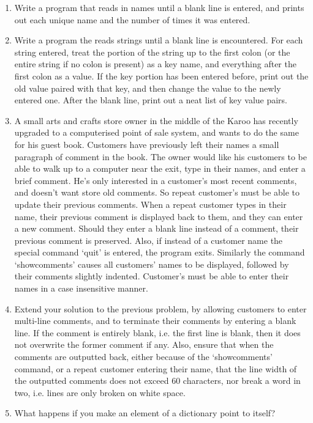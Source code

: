 \begin{enumerate}
\begin{enumerate}
\end{enumerate}
	\item Write a program that reads in names until a blank line is    entered, and prints out each unique name and the number of times    it was entered.
	\item Write a program the reads strings until a blank line is    encountered. For each string entered, treat the portion of the    string up to the first colon (or the entire string if no colon is    present) as a key name, and everything after the first colon as a    value. If the key portion has been entered before, print out the old    value paired with that key, and then change the value to the newly    entered one. After the blank line, print out a neat list of key    value pairs.
	\item A small arts and crafts store owner in the middle of the Karoo    has recently upgraded to a computerised point of sale system, and    wants to do the same for his guest book. Customers have previously    left their names a small paragraph of comment in the book. The owner    would like his customers to be able to walk up to a computer near    the exit, type in their names, and enter a brief comment. He's only    interested in a customer's most recent comments, and doesn't want    store old comments. So repeat customer's must be able to update    their previous comments. When a repeat customer types in their name,    their previous comment is displayed back to them, and they can       enter a new comment. Should they enter a    blank line instead of a comment, their previous comment is    preserved. Also, if instead of a customer name the special command    `quit' is entered, the program exits. Similarly the command    `showcomments' causes all customers' names to be displayed, followed    by their comments slightly indented. Customer's must be able to    enter their names in a case insensitive manner.
	\item Extend your solution to the previous problem, by allowing    customers to enter multi-line comments, and to terminate their    comments by entering a blank line. If the comment is entirely    blank, i.e. the first line is blank, then it does not overwrite the    former comment if any. Also, ensure that when the comments are    outputted back, either because of the `showcomments' command, or a    repeat customer entering their name, that the line width of the    outputted comments does not exceed 60 characters, nor break a word    in two, i.e. lines are only broken on white space.
	\item What happens if you make an element of a dictionary point to    itself?
\end{enumerate}   
